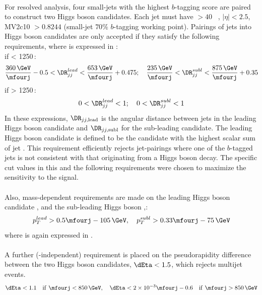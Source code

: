 \paragraph{}
For resolved analysis, four small-\R jets with the highest $b$-tagging score are paired to construct two Higgs boson candidates.  
Each jet must have \pt $> 40$ \GeV~, $|\eta| < 2.5$, MV2c10 $> 0.8244$ (small-\R jet $70\%$ $b$-tagging working point). 
Pairings of jets into Higgs boson candidates are only accepted if they satisfy the following requirements, where \mfourj is expressed in \GeV:\\
if \mfourj  < 1250\,\GeV:
\begin{equation}
\frac{360\,\GeV}{\mfourj} - 0.5 < \DR_{jj}^{lead} < \frac{653\,\GeV}{\mfourj} + 0.475;\quad
\frac{235\,\GeV}{\mfourj} < \DR_{jj}^{subl}  < \frac{875\,\GeV}{\mfourj} + 0.35
\end{equation}
\quad if \mfourj  > 1250\,\GeV:
\begin{equation}
0< \DR_{jj}^{lead} < 1;\quad 0 < \DR_{jj}^{subl} < 1
\end{equation}
In these expressions, $\DR_{jj, \mathrm{lead}}$ is the angular distance between jets in the leading Higgs boson candidate and $\DR_{jj, \mathrm{subl}}$ for the sub-leading candidate. 
The leading Higgs boson candidate is defined to be the candidate with the highest scalar sum of jet \pt. 
This requirement efficiently rejects jet-pairings where one of the $b$-tagged jets is not consistent with that originating from a Higgs boson decay. 
The specific cut values in this and the following requirements were chosen to maximize the sensitivity to the signal.

\paragraph{}
Also, mass-dependent requirements are made on the leading Higgs boson candidate \pt, and the sub-leading Higgs boson \pt,:
\begin{equation}
p_T^{lead} > 0.5\mfourj - 105\,\GeV, \quad
p_T^{subl} > 0.33\mfourj - 75\,\GeV
\end{equation}
where \mfourj is again expressed in \GeV.

\paragraph{}
A further (\mfourj-independent) requirement is placed on the pseudorapidity difference between the two Higgs boson candidates, $\dEta < 1.5$, which rejects multijet events.
\begin{equation}
\dEta < 1.1 \quad \mathrm{if}\ \mfourj < 850\,\GeV , \quad
\dEta < 2\times10^{-3} \mfourj - 0.6 \quad \mathrm{if}\ \mfourj > 850\,\GeV
\end{equation}

